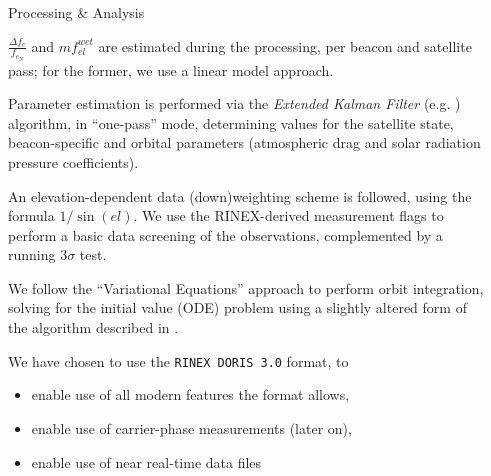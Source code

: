 \documentclass[final,a0,portrait]{beamer}
\newlength{\sepwid}
\newlength{\onecolwid}
\begin{document}
\begin{frame}[t]
\begin{columns}[t]
\begin{column}{\onecolwid}
\begin{block}{Processing \& Analysis}
{\begin{description}
\end{description}

$\frac{\Delta f_e}{f_{e_N}}$ and $mf_{el}^{wet}$ are estimated during the 
processing, per beacon and satellite pass; for the former, we use a linear 
model approach. \hfill \break

Parameter estimation is performed via the \emph{Extended Kalman Filter} 
(e.g. \cite{ZHOU20201700}) algorithm, in ``one-pass'' mode, determining 
values for the satellite state, beacon-specific and orbital parameters 
(atmospheric drag and solar radiation pressure coefficients). \hfill \break

An elevation-dependent data (down)weighting scheme is followed, using the 
formula $1 / \sin (el)$. We use the RINEX-derived measurement flags to perform 
a basic data screening of the observations, complemented by a running 
$3\sigma$ test. \hfill \break

We follow the ``Variational Equations'' approach to perform orbit integration, 
solving for the initial value (ODE) problem using a slightly altered form of 
the algorithm described in \cite{alma992703343902959}. \hfill \break

We have chosen to use the \texttt{RINEX DORIS 3.0} format, to 
\begin{itemize}
  \item enable use of all modern features the format allows,
  \item enable use of carrier-phase measurements (later on),
  \item enable use of near real-time data files
\end{itemize}
}

\end{block}


\end{column} %

\begin{column}{\sepwid}\end{column} %


\end{columns}
\end{frame}
\end{document}
